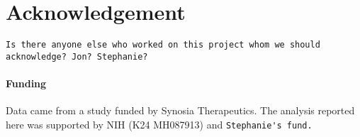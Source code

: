 \section*{Acknowledgement}
\verb|Is there anyone else who worked on this project whom we should acknowledge? Jon? Stephanie?|
\paragraph{Funding\textcolon} Data came from a study funded by Synosia Therapeutics. The analysis reported here was supported by NIH (K24 MH087913) and \verb|Stephanie's fund.|
